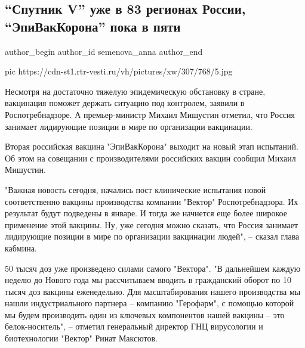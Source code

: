  
 
 
 
 
 
\subsection{\enquote{Спутник V} уже в 83 регионах России, \enquote{ЭпиВакКорона} пока в пяти}
\label{sec:11_12_2020.news.ru.vesti.semenova_anna.1.sputnik_v_83_regiona_russia}
\ifcmt
	author_begin
   author_id semenova_anna
	author_end
\fi



\ifcmt
pic https://cdn-st1.rtr-vesti.ru/vh/pictures/xw/307/768/5.jpg
\fi

Несмотря на достаточно тяжелую эпидемическую обстановку в стране, вакцинация
поможет держать ситуацию под контролем, заявили в Роспотребнадзоре. А
премьер-министр Михаил Мишустин отметил, что Россия занимает лидирующие позиции
в мире по организации вакцинации.

Вторая российская вакцина "ЭпиВакКорона" выходит на новый этап испытаний. Об
этом на совещании с производителями российских вакцин сообщил Михаил Мишустин.

"Важная новость сегодня, начались пост клинические испытания новой
соответственно вакцины производства компании "Вектор" Роспотребнадзора. Их
результат будут подведены в январе. И тогда же начнется еще более широкое
применение этой вакцины. Ну, уже сегодня можно сказать, что Россия занимает
лидирующие позиции в мире по организации вакцинации людей", – сказал глава
кабмина.

50 тысяч доз уже произведено силами самого "Вектора". "В дальнейшем каждую
неделю до Нового года мы рассчитываем вводить в гражданский оборот по 10 тысяч
доз вакцины еженедельно. Для масштабирования нашего производства мы нашли
индустриального партнера – компанию "Герофарм", с помощью которой мы будем
производить один из ключевых компонентов нашей вакцины – это белок-носитель", –
отметил генеральный директор ГНЦ вирусологии и биотехнологии "Вектор" Ринат
Максютов.

